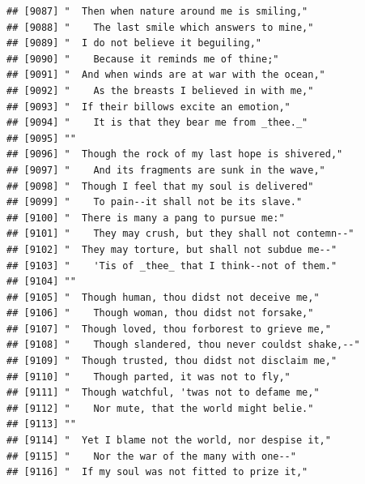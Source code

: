 \documentclass{article}\usepackage[]{graphicx}\usepackage[]{color}
\makeatletter
\newenvironment{kframe}{%
 \def\at@end@of@kframe{}%
 \ifinner\ifhmode%
  \def\at@end@of@kframe{\end{minipage}}%
  \begin{minipage}{\columnwidth}%
 \fi\fi%
 \def\FrameCommand##1{\hskip\@totalleftmargin \hskip-\fboxsep
 \colorbox{shadecolor}{##1}\hskip-\fboxsep
     \hskip-\linewidth \hskip-\@totalleftmargin \hskip\columnwidth}%
 \MakeFramed {\advance\hsize-\width
   \@totalleftmargin\z@ \linewidth\hsize
   \@setminipage}}%
 {\par\unskip\endMakeFramed%
 \at@end@of@kframe}
\newenvironment{knitrout}{}{} %
\makeatother
\begin{document}
\begin{knitrout}
\begin{kframe}
\begin{verbatim}
## [9087] "  Then when nature around me is smiling,"                                    
## [9088] "    The last smile which answers to mine,"                                   
## [9089] "  I do not believe it beguiling,"                                            
## [9090] "    Because it reminds me of thine;"                                         
## [9091] "  And when winds are at war with the ocean,"                                 
## [9092] "    As the breasts I believed in with me,"                                   
## [9093] "  If their billows excite an emotion,"                                       
## [9094] "    It is that they bear me from _thee._"                                    
## [9095] ""                                                                            
## [9096] "  Though the rock of my last hope is shivered,"                              
## [9097] "    And its fragments are sunk in the wave,"                                 
## [9098] "  Though I feel that my soul is delivered"                                   
## [9099] "    To pain--it shall not be its slave."                                     
## [9100] "  There is many a pang to pursue me:"                                        
## [9101] "    They may crush, but they shall not contemn--"                            
## [9102] "  They may torture, but shall not subdue me--"                               
## [9103] "    'Tis of _thee_ that I think--not of them."                               
## [9104] ""                                                                            
## [9105] "  Though human, thou didst not deceive me,"                                  
## [9106] "    Though woman, thou didst not forsake,"                                   
## [9107] "  Though loved, thou forborest to grieve me,"                                
## [9108] "    Though slandered, thou never couldst shake,--"                           
## [9109] "  Though trusted, thou didst not disclaim me,"                               
## [9110] "    Though parted, it was not to fly,"                                       
## [9111] "  Though watchful, 'twas not to defame me,"                                  
## [9112] "    Nor mute, that the world might belie."                                   
## [9113] ""                                                                            
## [9114] "  Yet I blame not the world, nor despise it,"                                
## [9115] "    Nor the war of the many with one--"                                      
## [9116] "  If my soul was not fitted to prize it,"                                    

\end{verbatim}
\end{kframe}
\end{knitrout}
\end{document}
